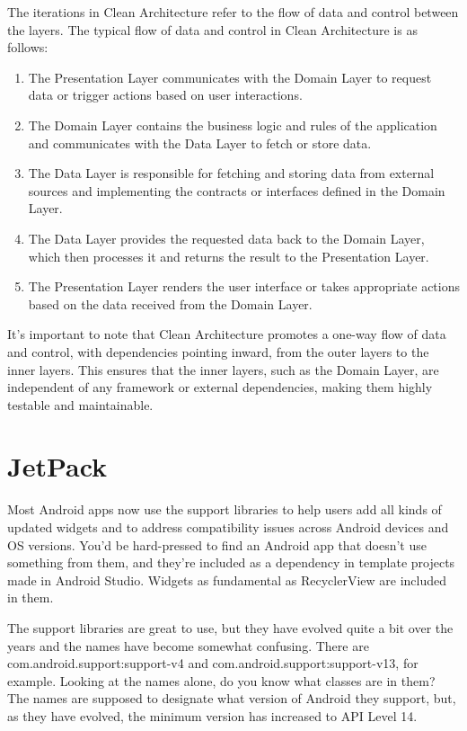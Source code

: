 \documentclass[a4paper, 12pt]{article}
\begin{document}
The iterations in Clean Architecture refer to the flow of data and control between the layers. 
The typical flow of data and control in Clean Architecture is as follows:

\begin{enumerate}
    \item The Presentation Layer communicates with the Domain Layer to request data or trigger actions based on user interactions.
    \item The Domain Layer contains the business logic and rules of the application and communicates with the Data Layer to fetch or store data.
    \item The Data Layer is responsible for fetching and storing data from external sources and implementing the contracts or interfaces defined in the Domain Layer.
    \item The Data Layer provides the requested data back to the Domain Layer, which then processes it and returns the result to the Presentation Layer.
    \item The Presentation Layer renders the user interface or takes appropriate actions based on the data received from the Domain Layer.
    
\end{enumerate}

It's important to note that Clean Architecture promotes a one-way flow of data and control, with dependencies pointing inward, from the outer layers to the inner layers. 
This ensures that the inner layers, such as the Domain Layer, are independent of any framework or external dependencies, making them highly testable and maintainable.


\section{JetPack}

Most Android apps now use the support libraries to help users add all kinds of updated widgets and to address compatibility issues across Android devices and OS versions. You’d be hard-pressed to find an Android app that doesn’t use something from them, and they’re included as a dependency in template projects made in Android Studio. Widgets as fundamental as RecyclerView are included in them.

The support libraries are great to use, but they have evolved quite a bit over the years and the names have become somewhat confusing. 
There are com.android.support:support-v4 and com.android.support:support-v13, for example. Looking at the names alone, do you know what classes are in them? 
The names are supposed to designate what version of Android they support, but, as they have evolved, the minimum version has increased to API Level 14.
\end{document}
